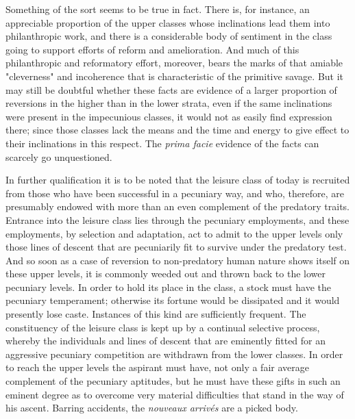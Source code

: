 \documentclass[12pt]{report}
\begin{document}
Something of the sort seems to be true in fact. There is, for instance,
an appreciable proportion of the upper classes whose inclinations
lead them into philanthropic work, and there is a considerable body
of sentiment in the class going to support efforts of reform and
amelioration. And much of this philanthropic and reformatory effort,
moreover, bears the marks of that amiable "cleverness" and incoherence
that is characteristic of the primitive savage. But it may still be
doubtful whether these facts are evidence of a larger proportion of
reversions in the higher than in the lower strata, even if the same
inclinations were present in the impecunious classes, it would not as
easily find expression there; since those classes lack the means and the
time and energy to give effect to their inclinations in this respect.
The \emph{prima facie} evidence of the facts can scarcely go unquestioned.

In further qualification it is to be noted that the leisure class of
today is recruited from those who have been successful in a pecuniary
way, and who, therefore, are presumably endowed with more than an even
complement of the predatory traits. Entrance into the leisure class lies
through the pecuniary employments, and these employments, by selection
and adaptation, act to admit to the upper levels only those lines of
descent that are pecuniarily fit to survive under the predatory test.
And so soon as a case of reversion to non-predatory human nature shows
itself on these upper levels, it is commonly weeded out and thrown back
to the lower pecuniary levels. In order to hold its place in the class,
a stock must have the pecuniary temperament; otherwise its fortune would
be dissipated and it would presently lose caste. Instances of this kind
are sufficiently frequent. The constituency of the leisure class is kept
up by a continual selective process, whereby the individuals and
lines of descent that are eminently fitted for an aggressive pecuniary
competition are withdrawn from the lower classes. In order to reach the
upper levels the aspirant must have, not only a fair average complement
of the pecuniary aptitudes, but he must have these gifts in such an
eminent degree as to overcome very material difficulties that stand in
the way of his ascent. Barring accidents, the \emph{nouveaux arrivés} are a
picked body.
\end{document}
